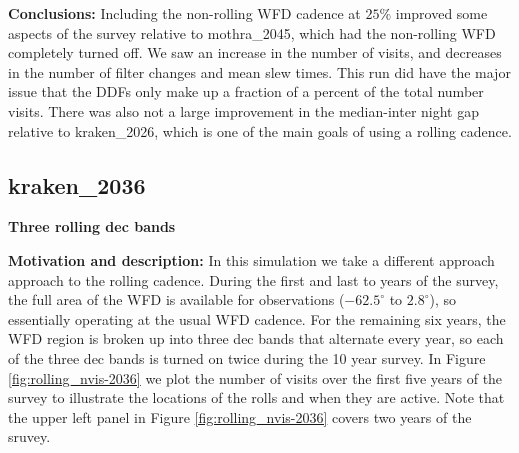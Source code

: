 \documentclass[DM,lsstdraft,authoryear,toc]{lsstdoc}
\begin{document}
\textbf{Conclusions:} Including the non-rolling WFD cadence at $25\%$ improved some aspects of the survey 
relative to mothra\_2045, which had the non-rolling WFD completely turned off. We saw an increase in the number of visits,
and decreases in the number of filter changes and mean slew times. This run did have the major issue that the DDFs only
make up a fraction of a percent of the total number visits. There was also not a large improvement in the median-inter night
gap relative to kraken\_2026, which is one of the main goals of using a rolling cadence.

\subsection{kraken\_2036} \label{kraken2036}

\textbf{Three rolling dec bands}

\textbf{Motivation and description:} In this simulation we take a different approach approach to the rolling cadence. During
the first and last to years of the survey, the full area of the WFD is available for observations ($-62.5^{\circ}$ to $2.8^{\circ}$), so essentially
operating at the usual WFD cadence. For the remaining six years, the WFD region is broken up into three dec bands that alternate every year,
so each of the three dec bands is turned on twice during the 10 year survey. In Figure \autoref{fig:rolling_nvis-2036}
we plot the number of visits over the first five years of the survey to illustrate the locations of the rolls and when they are active. Note that
the upper left panel in Figure \autoref{fig:rolling_nvis-2036} covers two years of the sruvey.
\end{document}
